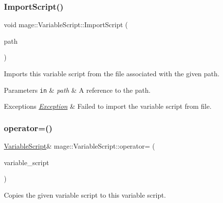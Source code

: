 \subsubsection{\texorpdfstring{Import\+Script()}{ImportScript()}\hspace{0.1cm}{\footnotesize\ttfamily [2/2]}}
{\footnotesize\ttfamily void mage\+::\+Variable\+Script\+::\+Import\+Script (\begin{DoxyParamCaption}\item[{const std\+::filesystem\+::path \&}]{path }\end{DoxyParamCaption})}

Imports this variable script from the file associated with the given path.


\begin{DoxyParams}[1]{Parameters}
\mbox{\tt in}  & {\em path} & A reference to the path. \\
\hline
\end{DoxyParams}

\begin{DoxyExceptions}{Exceptions}
{\em \mbox{\hyperlink{classmage_1_1_exception}{Exception}}} & Failed to import the variable script from file. \\
\hline
\end{DoxyExceptions}
\mbox{\label{classmage_1_1_variable_script_ae090b066ea939fc6611e77a47df6a97f}} 
\subsubsection{\texorpdfstring{operator=()}{operator=()}\hspace{0.1cm}{\footnotesize\ttfamily [1/2]}}
{\footnotesize\ttfamily \mbox{\hyperlink{classmage_1_1_variable_script}{Variable\+Script}}\& mage\+::\+Variable\+Script\+::operator= (\begin{DoxyParamCaption}\item[{const \mbox{\hyperlink{classmage_1_1_variable_script}{Variable\+Script}} \&}]{variable\+\_\+script }\end{DoxyParamCaption})\hspace{0.3cm}{\ttfamily [delete]}}

Copies the given variable script to this variable script.



